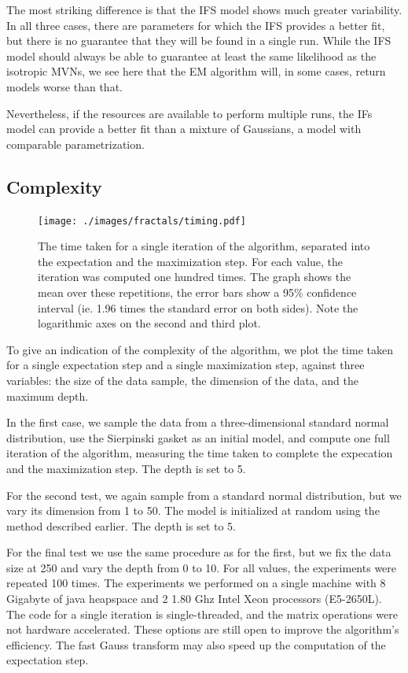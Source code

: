 The most striking difference is that the IFS model shows much greater variability. In all three cases, there are parameters for which the IFS provides a better fit, but there is no guarantee that they will be found in a single run. While the IFS model should always be able to guarantee at least the same likelihood as the isotropic MVNs, we see here that the EM algorithm will, in some cases, return models worse than that.

Nevertheless, if the resources are available to perform multiple runs, the IFs model can provide a better fit than a mixture of Gaussians, a model with comparable parametrization.

\subsection{Complexity}
\begin{figure}[htb]
  \texttt{[image: ./images/fractals/timing.pdf]}
  \caption{The time taken for a single iteration of the algorithm, separated into the expectation and the maximization step. For each value, the iteration was computed one hundred times. The graph shows the mean over these repetitions, the error bars show a 95\% confidence interval (ie. 1.96 times the standard error on both sides). Note the logarithmic axes on the second and third plot.}
  \label{figure:timing}
\end{figure}

To give an indication of the complexity of the algorithm, we plot the time taken for a single expectation step and a single maximization step, against three variables: the size of the data sample, the dimension of the data, and the maximum depth.

In the first case, we sample the data from a three-dimensional standard normal distribution, use the Sierpinski gasket as an initial model, and compute one full iteration of the algorithm, measuring the time taken to complete the expecation and the maximization step. The depth is set to 5. 

For the second test, we  again sample from a standard normal distribution, but we vary its dimension from 1 to 50. The model is initialized at random using the method described earlier. The depth is set to 5.

For the final test we use the same procedure as for the first, but we fix the data size  at 250 and vary the depth from 0 to 10.
For all values, the experiments were repeated 100 times. The experiments we performed on a single machine with 8 Gigabyte of java heapspace and 2 1.80 Ghz Intel Xeon processors (E5-2650L). The code for a single iteration is single-threaded, and the matrix operations were not hardware accelerated. \footnotemark These options are still open to improve the algorithm's efficiency. The fast Gauss transform \cite{greengard1991fast,yang2003improved} may also speed up the computation of the expectation step.

